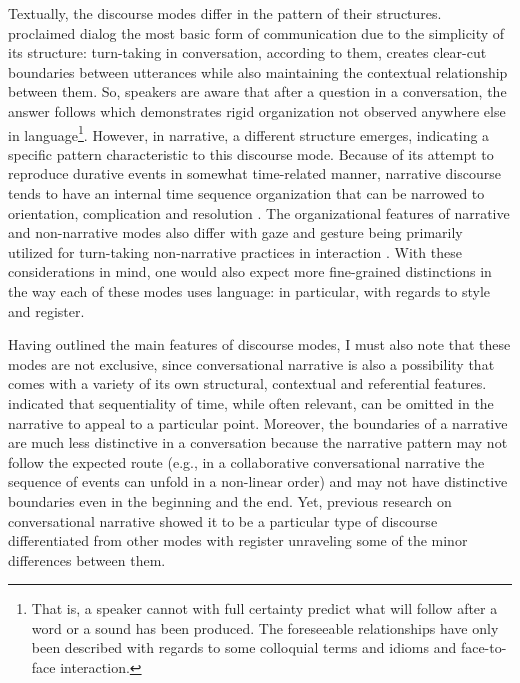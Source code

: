 \documentclass[12pt]{article}
\begin{document}
Textually, the discourse modes differ in the pattern of their structures. \textcite{bakhtin1986} proclaimed dialog the most basic form of communication due to the simplicity of its structure: turn-taking in conversation, according to them, creates clear-cut boundaries between utterances while also maintaining the contextual relationship between them. So, speakers are aware that after a question in a conversation, the answer follows which demonstrates rigid organization not observed anywhere else in language\footnote{That is, a speaker cannot with full certainty predict what will follow after a word or a sound has been produced. The foreseeable relationships have only been described with regards to some colloquial terms and idioms and face-to-face interaction.}. However, in  narrative, a different structure emerges, indicating a specific pattern characteristic to this discourse mode. Because of its attempt to reproduce durative events in somewhat time-related manner, narrative discourse tends to have an internal time sequence organization that can be narrowed to orientation, complication and resolution \parencite{labov1967}. The organizational features of narrative and non-narrative modes also differ with gaze and gesture being primarily utilized for turn-taking non-narrative practices in interaction \parencite{georgakopoulou2000}. With these considerations in mind, one would also expect more fine-grained distinctions in the way each of these modes uses language: in particular, with regards to style and register. 

Having outlined the main features of discourse modes, I must also note that these modes are not exclusive, since conversational narrative is also a possibility that comes with a variety of its own structural, contextual and referential features. \textcite{norrick2000} indicated that sequentiality of time, while often relevant, can be omitted in the narrative to appeal to a particular point. Moreover, the boundaries of a narrative are much less distinctive in a conversation because the narrative pattern may not follow the expected route (e.g., in a collaborative conversational narrative the sequence of events can unfold in a non-linear order) and may not have distinctive boundaries even in the beginning and the end. Yet, previous research on conversational narrative showed it to be a particular type of discourse differentiated from other modes with register unraveling some of the minor differences between them.
\end{document}
